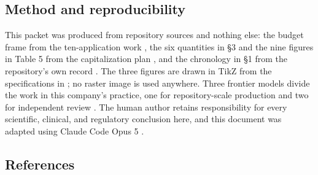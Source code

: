 \subsection{Method and reproducibility}

This packet was produced from repository sources and nothing else: the budget
frame from the ten-application work \cite{tenapps2026}, the six quantities in
\S3 and the nine figures in Table 5 from the capitalization plan
\cite{capitalplan2026}, and the chronology in \S1 from the repository's own
record \cite{daraxstory2026}. The three figures are drawn in TikZ from the
specifications in ; no raster image
is used anywhere. Three frontier models divide the work in this company's
practice, one for repository-scale production and two for independent review
\cite{tripartisan2026}. The human author retains responsibility for every
scientific, clinical, and regulatory conclusion here, and this document was
adapted using Claude Code Opus 5 \cite{repo2026}.

\clearpage
\subsection{References}

\begin{apprefs}


\end{apprefs}
